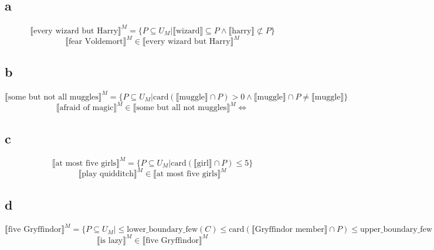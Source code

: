 \documentclass{article}
\begin{document}

\section{}

\subsection*{a}

$$\llbracket \text{every wizard but Harry} \rrbracket^M = \{P \subseteq U_M | \llbracket \text{wizard} \rrbracket \subseteq P \wedge \llbracket \text{harry} \rrbracket \not\subset P\}$$
$$\llbracket\text{fear Voldemort}\rrbracket^M \in \llbracket\text{every wizard but Harry}\rrbracket^M$$


\subsection*{b}

$$\llbracket \text{some but not all muggles} \rrbracket^M = \{P \subseteq U_M |  \text{card}(\llbracket\text{muggle}\rrbracket \cap P) > 0 \wedge \llbracket\text{muggle}\rrbracket \cap P \neq \llbracket\text{muggle}\rrbracket\}$$
$$\llbracket\text{afraid of magic}\rrbracket^M \in \llbracket\text{some but all not muggles}\rrbracket^M \Leftrightarrow$$

\subsection*{c}

$$\llbracket \text{at most five girls} \rrbracket^M = \{P \subseteq U_M |  \text{card}(\llbracket\text{girl}\rrbracket \cap P) \leq 5\}$$
$$\llbracket\text{play quidditch}\rrbracket^M \in \llbracket\text{at most five girls}\rrbracket^M$$

\subsection*{d}

$$\llbracket \text{five Gryffindor} \rrbracket^M = \{P \subseteq U_M |  \leq \text{lower\_boundary\_few}(C) \leq  \text{card}(\llbracket\text{Gryffindor member}\rrbracket \cap P) \leq \text{upper\_boundary\_few}(C)\}$$
$$\llbracket\text{is lazy}\rrbracket^M \in \llbracket\text{five Gryffindor}\rrbracket^M$$
\end{document}
